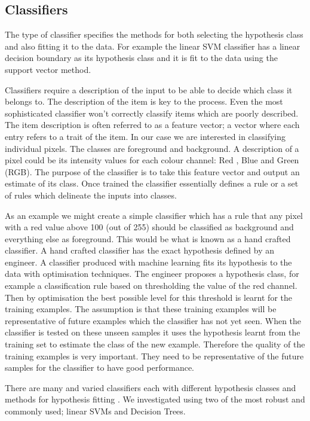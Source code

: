\documentclass[12pt]{IIBproject}
\begin{document}
\subsection{Classifiers}
The type of classifier specifies the methods for both selecting the hypothesis class and also fitting it to the data. For example the linear SVM classifier has a linear decision boundary as its hypothesis class and it is fit to the data using the support vector method.

Classifiers require a description of the input to be able to decide which class it belongs to. The description of the item is key to the process. Even the most sophisticated classifier won't correctly classify items which are poorly described. The item description is often referred to as a feature vector; a vector where each entry refers to a trait of the item. In our case we are interested in classifying individual pixels. The classes are foreground and background. A description of a pixel could be its intensity values for each colour channel: Red , Blue and Green (RGB). The purpose of the classifier is to take this feature vector and output an estimate of its class. Once trained the classifier essentially defines a rule or a set of rules which delineate the inputs into classes.

 As an example we might create a simple classifier which has a rule that any pixel with a red value above 100 (out of 255) should be classified as background and everything else as foreground. This would be what is known as a hand crafted classifier. A hand crafted classifier has the exact hypothesis defined by an engineer. A classifier produced with machine learning fits its hypothesis to the data with optimisation techniques. The engineer proposes a hypothesis class, for example a classification rule based on thresholding the value of the red channel. Then by optimisation the best possible level for this threshold is learnt for the training examples. The assumption is that these training examples will be representative of future examples which the classifier has not yet seen. When the classifier is tested on these unseen samples it uses the hypothesis learnt from the training set to estimate the class of the new example. Therefore the quality of the training examples is very important. They need to be representative of the future samples for the classifier to have good performance.
 
 There are many and varied classifiers each with different hypothesis classes and methods for hypothesis fitting . We investigated using two of the most robust and commonly used; linear SVMs and Decision Trees. 
 
\end{document}
